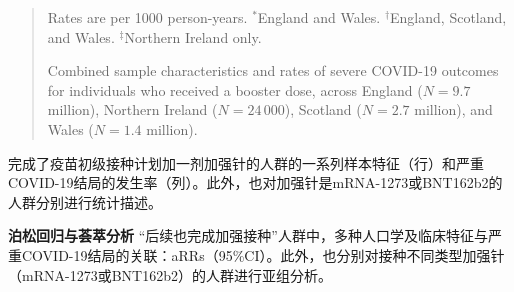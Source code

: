 \begin{quote}\footnotesize Rates are per 1000 person-years. $^*$England and Wales. $^\dagger$England, Scotland, and Wales. $^\ddagger$Northern Ireland only.

Combined sample characteristics and rates of severe COVID-19 outcomes for individuals who received a booster dose, across England ($N=9.7$ million), Northern Ireland ($N=24\,000$), Scotland ($N=2.7$ million), and Wales ($N=1.4$ million).\end{quote}
完成了疫苗初级接种计划加一剂加强针的人群的一系列样本特征（行）和严重COVID-19结局的发生率（列）。此外，也对加强针是mRNA-1273或BNT162b2的人群分别进行统计描述。

\textbf{泊松回归与荟萃分析} “后续也完成加强接种”人群中，多种人口学及临床特征与严重COVID-19结局的关联：aRRs（95\%CI）。此外，也分别对接种不同类型加强针（mRNA-1273或BNT162b2）的人群进行亚组分析。
